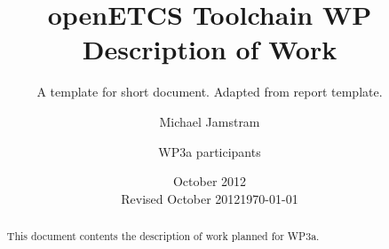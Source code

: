 \documentclass{template/openetcs_article}
\begin{document}
\frontmatter
{}





\title{openETCS Toolchain WP Description of Work}

\subtitle{A template for short document. Adapted from report template.}

\date{October 2012\\Revised October 2012}
\date{\today}


\author{Michael Jamstram}

  
\author{WP3a participants}

    



\begin{abstract}
This document contents the description of work  planned for WP3a.

\end{abstract}

\maketitle
\tableofcontents
\listoffiguresandtables
\newpage








\setlength{\marginparwidth}{1in}
\let\oldmarginpar\marginpar
\renewcommand\marginpar[1]{\-\oldmarginpar[\raggedleft\scriptsize #1]%
{\raggedright\scriptsize #1}}

\newcommand{\oldtext}[1]{{Old: \scriptsize #1}}
\end{document}
